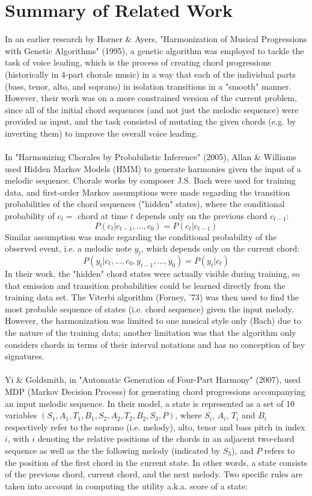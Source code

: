 \documentclass[twoside]{article}
\begin{document}
	\section{Summary of Related Work}
	In an earlier research by Horner \& Ayers, "Harmonization of Musical Progressions with Genetic Algorithms" (1995), a genetic algorithm was employed to tackle the task of voice leading, which is the process of creating chord progressions (historically in 4-part chorale music) in a way that each of the individual parts (bass, tenor, alto, and soprano) in isolation transitions in a "smooth" manner. However, their work was on a more constrained version of the current problem, since all of the initial chord sequences (and not just the melodic sequence) were provided as input, and the task consisted of mutating the given chords (e.g. by inverting them) to improve the overall voice leading.
	\\\\
	In "Harmonizing Chorales by Probabilistic Inference" (2005), Allan \& Williams used Hidden Markov Models (HMM) to generate harmonies given the input of a melodic sequence. Chorale works by composer J.S. Bach were used for training data, and first-order Markov assumptions were made regarding the transition probabilities of the chord sequences ("hidden" states), where the conditional probability of $c_t = $ chord at time $t$ depends only on the previous chord $c_{t-1}$:
	$$P(c_t | c_{t-1}, ..., c_0) = P(c_t | c_{t-1})$$
	Similar assumption was made regarding the conditional probability of the observed event, i.e. a melodic note $y_t$, which depends only on the current chord:
	$$P(y_t | c_t, ..., c_0, y_{t-1}, ..., y_0) = P(y_t | c_t)$$
	In their work, the "hidden" chord states were actually visible during training, so that emission and transition probabilities could be learned directly from the training data set. The Viterbi algorithm (Forney, '73) was then used to find the most probable sequence of states (i.e. chord sequence) given the input melody. However, the harmonization was limited to one musical style only (Bach) due to the nature of the training data; another limitation was that the algorithm only considers chords in terms of their interval notations and has no conception of key signatures.
	\\\\
	Yi \& Goldsmith, in "Automatic Generation of Four-Part Harmony" (2007), used MDP (Markov Decision Process) for generating chord progressions accompanying an input melodic sequence. In their model, a state is represented as a set of 10 variables $(S_1, A_1, T_1, B_1, S_2, A_2, T_2, B_2, S_3, P)$, where $S_i$, $A_i$, $T_i$ and $B_i$ respectively refer to the soprano (i.e. melody), alto, tenor and bass pitch in index $i$, with $i$ denoting the relative positions of the chords in an adjacent two-chord sequence as well as the the following melody (indicated by $S_3$), and $P$ refers to the position of the first chord in the current state. In other words, a state consists of the previous chord, current chord, and the next melody. Two specific rules are taken into account in computing the utility a.k.a. score of a state: 
\end{document}
